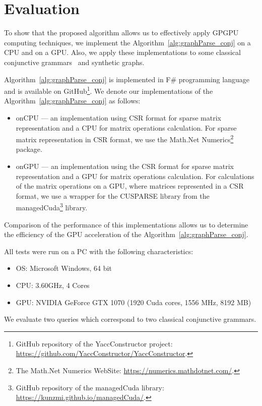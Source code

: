 \section{Evaluation} \label{section_evaluation}
To show that the proposed algorithm allows us to effectively apply GPGPU computing techniques, we implement the Algorithm~\ref{alg:graphParse_conj} on a CPU and on a GPU. Also, we apply these implementations to some classical conjunctive grammars~\cite{okhotin2001conjunctive} and synthetic graphs.

Algorithm~\ref{alg:graphParse_conj} is implemented in F\# programming language~\cite{fsharp} and is available on GitHub\footnote{GitHub repository of the YaccConstructor project: \url{https://github.com/YaccConstructor/YaccConstructor}.}. We denote our implementations of the Algorithm~\ref{alg:graphParse_conj} as follows:
\begin{itemize}
    \item onCPU --- an implementation using CSR format for sparse matrix representation and a CPU for matrix operations calculation. For sparse matrix representation in CSR format, we use the Math.Net Numerics\footnote{The Math.Net Numerics WebSite: \url{https://numerics.mathdotnet.com/}.} package.
    \item onGPU --- an implementation using the CSR format for sparse matrix representation and a GPU for matrix operations calculation. For calculations of the matrix operations on a GPU, where matrices represented in a CSR format, we use a wrapper for the CUSPARSE library from the managedCuda\footnote{GitHub repository of the managedCuda library: \url{https://kunzmi.github.io/managedCuda/}.} library.
\end{itemize}

Comparison of the performance of this implementations allows us to determine the efficiency of the GPU acceleration of the Algorithm~\ref{alg:graphParse_conj}.

All tests were run on a PC with the following characteristics:
\begin{itemize}
    \item OS: Microsoft Windows, 64 bit
    \item CPU: 3.60GHz, 4 Cores
    \item GPU: NVIDIA GeForce GTX 1070 (1920 Cuda cores, 1556 MHz, 8192 MB)
\end{itemize}

We evaluate two queries which correspond to two classical conjunctive grammars.

